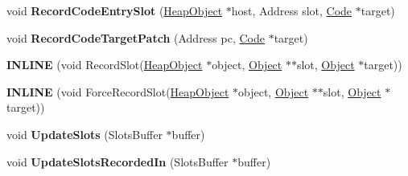 \begin{DoxyCompactItemize}
\item 
void {\bfseries Record\+Code\+Entry\+Slot} (\hyperlink{classv8_1_1internal_1_1_heap_object}{Heap\+Object} $\ast$host, Address slot, \hyperlink{classv8_1_1internal_1_1_code}{Code} $\ast$target)\hypertarget{classv8_1_1internal_1_1_mark_compact_collector_a67f3930ad7c480fdda25306067412543}{}\label{classv8_1_1internal_1_1_mark_compact_collector_a67f3930ad7c480fdda25306067412543}

\item 
void {\bfseries Record\+Code\+Target\+Patch} (Address pc, \hyperlink{classv8_1_1internal_1_1_code}{Code} $\ast$target)\hypertarget{classv8_1_1internal_1_1_mark_compact_collector_a5619987a441114712ab02777ce3692c9}{}\label{classv8_1_1internal_1_1_mark_compact_collector_a5619987a441114712ab02777ce3692c9}

\item 
{\bfseries I\+N\+L\+I\+NE} (void Record\+Slot(\hyperlink{classv8_1_1internal_1_1_heap_object}{Heap\+Object} $\ast$object, \hyperlink{classv8_1_1internal_1_1_object}{Object} $\ast$$\ast$slot, \hyperlink{classv8_1_1internal_1_1_object}{Object} $\ast$target))\hypertarget{classv8_1_1internal_1_1_mark_compact_collector_a86870fb8331072d15e0f08441b244b8f}{}\label{classv8_1_1internal_1_1_mark_compact_collector_a86870fb8331072d15e0f08441b244b8f}

\item 
{\bfseries I\+N\+L\+I\+NE} (void Force\+Record\+Slot(\hyperlink{classv8_1_1internal_1_1_heap_object}{Heap\+Object} $\ast$object, \hyperlink{classv8_1_1internal_1_1_object}{Object} $\ast$$\ast$slot,                                                                                                               \hyperlink{classv8_1_1internal_1_1_object}{Object} $\ast$target))\hypertarget{classv8_1_1internal_1_1_mark_compact_collector_a2870efc100c2eaf21a484dbb46712982}{}\label{classv8_1_1internal_1_1_mark_compact_collector_a2870efc100c2eaf21a484dbb46712982}

\item 
void {\bfseries Update\+Slots} (Slots\+Buffer $\ast$buffer)\hypertarget{classv8_1_1internal_1_1_mark_compact_collector_a702de8dcf3805cb26737fd8c49ee418f}{}\label{classv8_1_1internal_1_1_mark_compact_collector_a702de8dcf3805cb26737fd8c49ee418f}

\item 
void {\bfseries Update\+Slots\+Recorded\+In} (Slots\+Buffer $\ast$buffer)\hypertarget{classv8_1_1internal_1_1_mark_compact_collector_aa457d18f672391249f62c8f3da4a2bd2}{}\label{classv8_1_1internal_1_1_mark_compact_collector_aa457d18f672391249f62c8f3da4a2bd2}


\end{DoxyCompactItemize}
